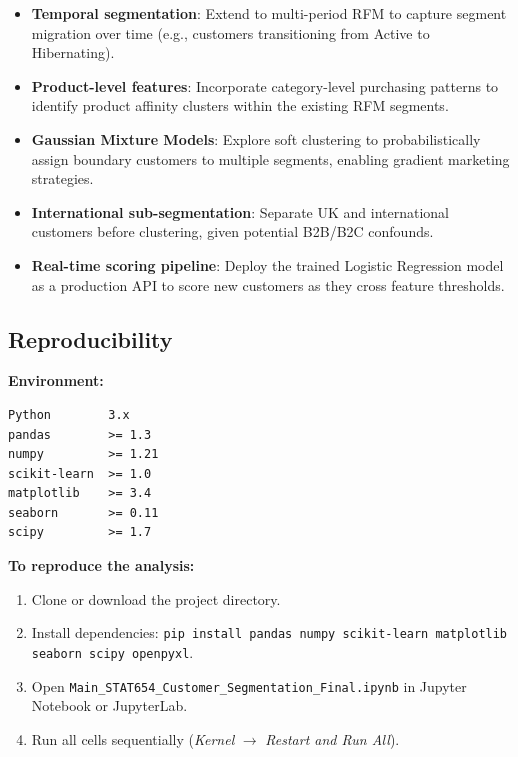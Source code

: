 \documentclass[12pt,a4paper]{article}
\begin{document}
\begin{itemize}[leftmargin=*]
  \item \textbf{Temporal segmentation}: Extend to multi-period RFM to capture
        segment migration over time (e.g., customers transitioning from Active to
        Hibernating).
  \item \textbf{Product-level features}: Incorporate category-level purchasing patterns
        to identify product affinity clusters within the existing RFM segments.
  \item \textbf{Gaussian Mixture Models}: Explore soft clustering to probabilistically
        assign boundary customers to multiple segments, enabling gradient marketing strategies.
  \item \textbf{International sub-segmentation}: Separate UK and international
        customers before clustering, given potential B2B/B2C confounds.
  \item \textbf{Real-time scoring pipeline}: Deploy the trained Logistic Regression
        model as a production API to score new customers as they cross feature thresholds.
\end{itemize}

\subsection{Reproducibility}

\textbf{Environment:}
\begin{verbatim}
Python        3.x
pandas        >= 1.3
numpy         >= 1.21
scikit-learn  >= 1.0
matplotlib    >= 3.4
seaborn       >= 0.11
scipy         >= 1.7
\end{verbatim}

\textbf{To reproduce the analysis:}
\begin{enumerate}[leftmargin=*]
  \item Clone or download the project directory.
  \item Install dependencies: \texttt{pip install pandas numpy scikit-learn
        matplotlib seaborn scipy openpyxl}.
  \item Open \texttt{Main\_STAT654\_Customer\_Segmentation\_Final.ipynb} in
        Jupyter Notebook or JupyterLab.
  \item Run all cells sequentially (\textit{Kernel} $\to$ \textit{Restart and Run All}).
\end{enumerate}
\end{document}
